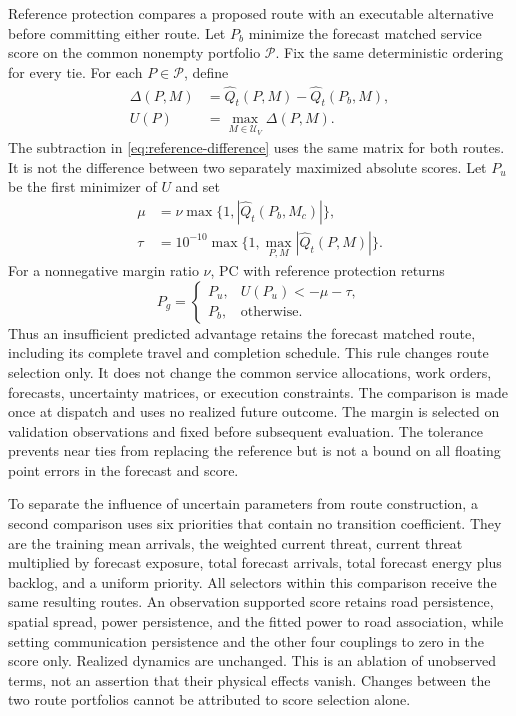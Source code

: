 Reference protection compares a proposed route with an executable alternative
before committing either route.  Let $P_b$ minimize the forecast matched
service score on the common nonempty portfolio $\mathcal P$.  Fix the same
deterministic ordering for every tie.  For each $P\in\mathcal P$, define
\begin{align}
\Delta(P,M)&=\widehat Q_t(P,M)-\widehat Q_t(P_b,M),\\
U(P)&=\max_{M\in\mathcal U_V}\Delta(P,M).
\label{eq:reference-difference}
\end{align}
The subtraction in \eqref{eq:reference-difference} uses the same matrix for
both routes.  It is not the difference between two separately maximized
absolute scores.  Let $P_u$ be the first minimizer of $U$ and set
\begin{align}
\mu&=\nu\max\{1,|\widehat Q_t(P_b,M_c)|\},\\
\tau&=10^{-10}\max\{1,\max_{P,M}|\widehat Q_t(P,M)|\}.
\end{align}
For a nonnegative margin ratio $\nu$, PC with reference protection returns
\begin{equation}
P_g=\begin{cases}
P_u,&U(P_u)<-\mu-\tau,\\
P_b,&\text{otherwise}.
\end{cases}
\label{eq:protected-route}
\end{equation}
Thus an insufficient predicted advantage retains the forecast matched route,
including its complete travel and completion schedule.  This rule changes
route selection only.  It does not change the common service allocations,
work orders, forecasts, uncertainty matrices, or execution constraints.
The comparison is made once at dispatch and uses no realized future outcome.
The margin is selected on validation observations and fixed before subsequent
evaluation.  The tolerance prevents near ties from replacing the reference
but is not a bound on all floating point errors in the forecast and score.

To separate the influence of uncertain parameters from route construction,
a second comparison uses six priorities that contain no transition
coefficient.  They are the training mean arrivals, the weighted current
threat, current threat multiplied by forecast exposure, total forecast
arrivals, total forecast energy plus backlog, and a uniform priority.
All selectors within this comparison receive the same resulting routes.
An observation supported score retains road persistence, spatial spread,
power persistence, and the fitted power to road association, while setting
communication persistence and the other four couplings to zero in the
score only.  Realized dynamics are unchanged.  This is an ablation of
unobserved terms, not an assertion that their physical effects vanish.
Changes between the two route portfolios cannot be attributed to score
selection alone.
